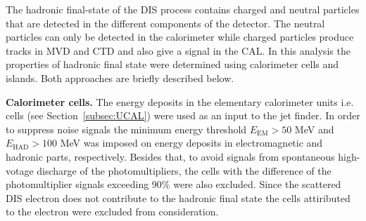 The hadronic final-state of the DIS process contains charged and neutral particles that are detected in the different components of the \zeus detector. The neutral particles can only be detected in the calorimeter while charged particles produce tracks in MVD and CTD and also give a signal in the CAL. In this analysis the properties of hadronic final state were determined using calorimeter cells and islands. Both approaches are briefly described below.

\textbf{Calorimeter cells.}
The energy deposits in the elementary calorimeter units i.e. cells (see Section~\ref{subsec:UCAL}) were used as an input to the jet finder. In order to suppress noise signals the minimum energy threshold $E_\text{EM}>50$ MeV and $E_\text{HAD}>100$ MeV was imposed on energy deposits in electromagnetic and hadronic parts, respectively. Besides that, to avoid signals from spontaneous high-votage discharge of the photomultipliers, the cells with the difference of the photomultiplier signals exceeding 90\% were also excluded. Since the scattered DIS electron does not contribute to the hadronic final state the cells attiributed to the electron were excluded from consideration. 

